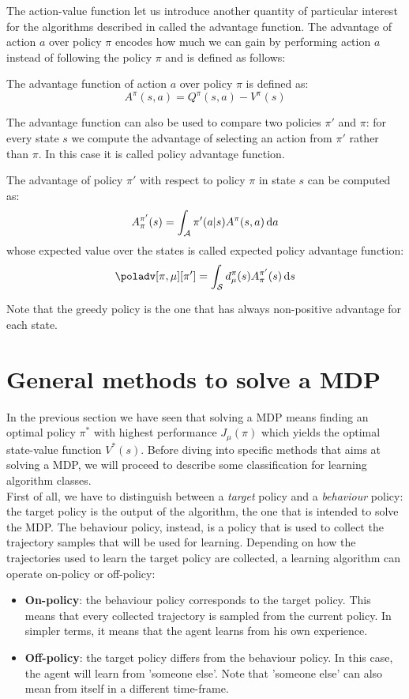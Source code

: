The action-value function let us introduce another quantity of particular interest for the algorithms described in  called the advantage function. The advantage of action $a$ over policy $\pi$ encodes how much we can gain by performing action $a$ instead of following the policy $\pi$ and is defined as follows:
\begin{definition}
The advantage function of action $a$ over policy $\pi$ is defined as:
\[
A^{\pi}(s,a) = Q^{\pi}(s,a) - V^{\pi}(s)
\]
\end{definition}

The advantage function can also be used to compare two policies $\pi'$ and $\pi$: for every state $s$ we compute the advantage of selecting an action from $\pi'$ rather than $\pi$. In this case it is called policy advantage function.
\begin{definition}
The advantage of policy $\pi'$ with respect to policy $\pi$ in state $s$ can be computed as:
\[
A_\pi^{\pi'}(s) = \int_{\mathcal{A}} \pi'(a|s)A^\pi(s, a) \, \textrm{d} a
\]
whose expected value over the states is called expected policy advantage function:
\[
\poladv[\pi,\mu][\pi'] = \int_{\sspace} d_\mu^{\pi}(s)A_\pi^{\pi'}(s) \de s
\]
\end{definition}

Note that the greedy policy is the one that has always non-positive advantage for each state. 


\section{General methods to solve a MDP}
\label{sec:solve-mdp}

In the previous section we have seen that solving a MDP means finding an optimal policy $\pi^*$ with highest performance $J_\mu(\pi)$ which yields the optimal state-value function $V^*(s)$. Before diving into specific methods that aims at solving a MDP, we will proceed to describe some classification for learning algorithm classes.\\
First of all, we have to distinguish between a \textit{target} policy and a \textit{behaviour} policy: the target policy is the output of the algorithm, the one that is intended to solve the MDP. The behaviour policy, instead, is a policy that is used to collect the trajectory samples that will be used for learning. Depending on how the trajectories used to learn the target policy are collected, a learning algorithm can operate on-policy or off-policy:
\begin{itemize}
\item \textbf{On-policy}: the behaviour policy corresponds to the target policy. This means that every collected trajectory is sampled from the current policy. In simpler terms, it means that the agent learns from his own experience.
\item \textbf{Off-policy}: the target policy differs from the behaviour policy. In this case, the agent will learn from 'someone else'. Note that 'someone else' can also mean from itself in a different time-frame.
\end{itemize}

